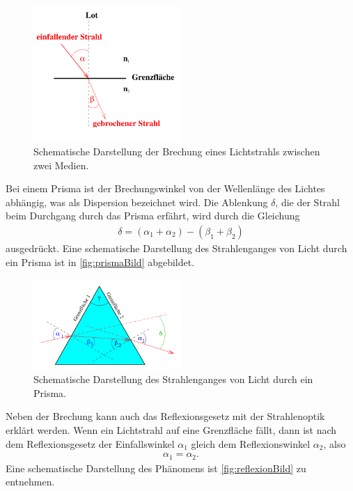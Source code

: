 \begin{figure}[H]
    \centering
    \includegraphics[width=0.5\textwidth]{data/brechung.png}
    \caption{Schematische Darstellung der Brechung eines Lichtstrahls zwischen zwei Medien\cite{Anleitung400}.}
    \label{fig:brechungBild}
\end{figure}

\noindent
Bei einem Prisma ist der Brechungswinkel von der Wellenlänge des Lichtes abhängig, was als Dispersion bezeichnet wird. Die Ablenkung $\delta$, die der Strahl beim Durchgang durch das Prisma erfährt,
wird durch die Gleichung
\begin{align}
    \delta = (\alpha_1+\alpha_2) - (\beta_1 + \beta_2)
    \label{eqn:prismaWinkel}
\end{align}
ausgedrückt. Eine schematische Darstellung des Strahlenganges von Licht durch ein Prisma ist in \autoref{fig:prismaBild} abgebildet.

\begin{figure}[H]
    \centering
    \includegraphics[width=0.5\textwidth]{data/prisma.png}
    \caption{Schematische Darstellung des Strahlenganges von Licht durch ein Prisma\cite{Anleitung400}.}
    \label{fig:prismaBild}
\end{figure}

\noindent
Neben der Brechung kann auch das Reflexionsgesetz mit der Strahlenoptik erklärt werden. Wenn ein Lichtstrahl auf eine Grenzfläche fällt, dann ist nach dem Reflexionsgesetz der Einfallswinkel $\alpha_1$ gleich dem Reflexionswinkel $\alpha_2$, also
\begin{align}
    \label{eqn:einfallAusfall}
    \alpha_1 = \alpha_2.
\end{align}
Eine schematische Darstellung des Phänomens ist \autoref{fig:reflexionBild} zu entnehmen. \newline

